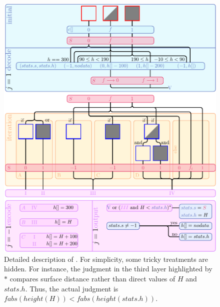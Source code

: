 \begin{figure}
    \centering
    \includegraphics{./image/heights-h/column}
    \caption{Detailed description of . For simplicity, some tricky treatments are hidden. For instance, the judgment in the third layer highlighted by $\ast$ compares surface distance rather than direct values of $H$ and $stats.h$. Thus, the actual judgment is $fabs(height(H))<fabs(height(stats.h))$.}
    \label{fig:heights-column}
\end{figure}

